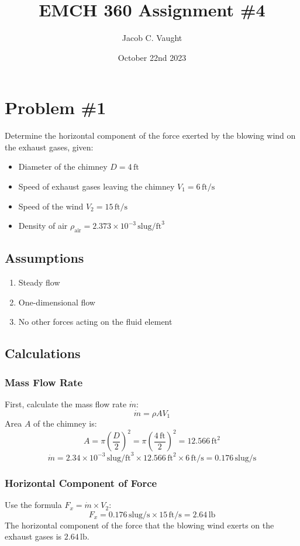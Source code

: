 \documentclass{article}
\title{EMCH 360 Assignment \#4}
\author{Jacob C. Vaught}
\date{October 22nd 2023}
\begin{document}
\maketitle



\section*{Problem \#1}
Determine the horizontal component of the force exerted by the blowing wind on the exhaust gases, given:
\begin{itemize}
    \item Diameter of the chimney \(D = 4 \, \text{ft}\)
    \item Speed of exhaust gases leaving the chimney \(V_1 = 6 \, \text{ft/s}\)
    \item Speed of the wind \(V_2 = 15 \, \text{ft/s}\)
    \item Density of air \(\rho_{\text{air}} = 2.373 \times 10^{-3} \, \text{slug/ft}^3\)
\end{itemize}

\subsection*{Assumptions}
\begin{enumerate}
    \item Steady flow
    \item One-dimensional flow
    \item No other forces acting on the fluid element
\end{enumerate}

\subsection*{Calculations}

\subsubsection*{Mass Flow Rate}
First, calculate the mass flow rate \(\dot{m}\):
\[
\dot{m} = \rho A V_1
\]
Area \(A\) of the chimney is:
\[
A = \pi \left( \frac{D}{2} \right)^2 = \pi \left( \frac{4 \, \text{ft}}{2} \right)^2 = 12.566 \, \text{ft}^2
\]
\[
\dot{m} = 2.34 \times 10^{-3} \, \text{slug/ft}^3 \times 12.566 \, \text{ft}^2 \times 6 \, \text{ft/s} = 0.176 \, \text{slug/s}
\]

\subsubsection*{Horizontal Component of Force}
Use the formula \( F_x = \dot{m} \times V_2 \):
\[
F_x = 0.176 \, \text{slug/s} \times 15 \, \text{ft/s} = 2.64 \, \text{lb}
\]
The horizontal component of the force that the blowing wind exerts on the exhaust gases is \(2.64 \, \text{lb}\).
\end{document}
